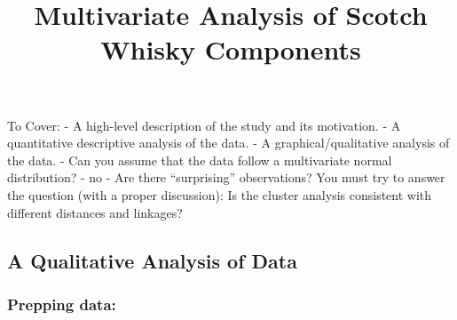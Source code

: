 \documentclass[
  letterpaper,
  DIV=11,
  numbers=noendperiod]{scrartcl}
\title{Multivariate Analysis of Scotch Whisky Components}
\author{}
\date{}
\begin{document}
\maketitle


To Cover: - A high-level description of the study and its motivation. -
A quantitative descriptive analysis of the data. - A
graphical/qualitative analysis of the data. - Can you assume that the
data follow a multivariate normal distribution? - no - Are there
``surprising'' observations? You must try to answer the question (with a
proper discussion): Is the cluster analysis consistent with different
distances and linkages?

\subsection{A Qualitative Analysis of
Data}\label{a-qualitative-analysis-of-data}

\subsubsection{Prepping data:}\label{prepping-data}
\end{document}
